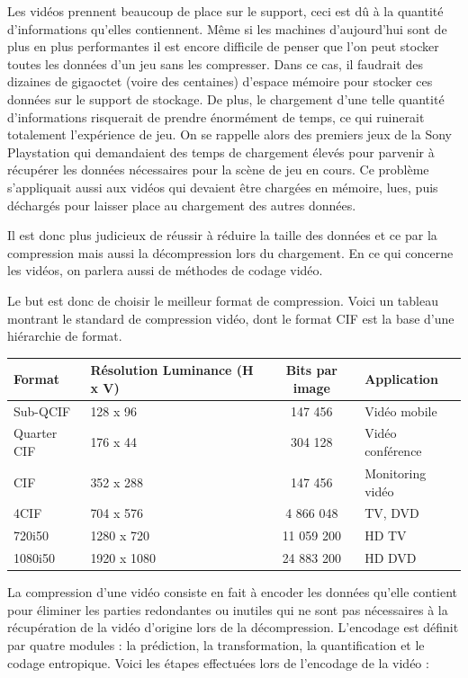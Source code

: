 \documentclass[a4paper, 12pt]{article} %
\begin{document}
Les vidéos prennent beaucoup de place sur le support, ceci est dû à la quantité d'informations qu'elles contiennent. Même si les machines d'aujourd'hui sont de plus en plus performantes il est encore difficile de penser que l'on peut stocker toutes les données d'un jeu sans les compresser. Dans ce cas, il faudrait des dizaines de gigaoctet (voire des centaines) d'espace mémoire pour stocker ces données sur le support de stockage. De plus, le chargement d'une telle quantité d'informations risquerait de prendre énormément de temps, ce qui ruinerait totalement l'expérience de jeu. On se rappelle alors des premiers jeux de la Sony Playstation qui demandaient des temps de chargement élevés pour parvenir à récupérer les données nécessaires pour la scène de jeu en cours. Ce problème s'appliquait aussi aux vidéos qui devaient être chargées en mémoire, lues, puis déchargés pour laisser place au chargement des autres données.

Il est donc plus judicieux de réussir à réduire la taille des données et ce par la compression mais aussi la décompression lors du chargement. En ce qui concerne les vidéos, on parlera aussi de méthodes de codage vidéo.

Le but est donc de choisir le meilleur format de compression. Voici un tableau montrant le standard de compression vidéo, dont le format CIF est la base d'une hiérarchie de format.

\begin{center}
	\begin{tabular}{|l|p{}|c|l|}
		\hline
		Format & Résolution Luminance (H x V) & Bits par image & Application\\
		\hline
		Sub-QCIF&128 x 96&147 456&Vidéo mobile\\
		Quarter CIF&176 x 44&304 128&Vidéo conférence\\
		CIF&352 x 288&147 456&Monitoring vidéo\\
		4CIF&704 x 576&4 866 048&TV, DVD\\
		720i50&1280 x 720&11 059 200&HD TV\\
		1080i50&1920 x 1080&24 883 200&HD DVD\\
		\hline
	\end{tabular}
\end{center}

La compression d'une vidéo consiste en fait à encoder les données qu'elle contient pour éliminer les parties redondantes ou inutiles qui ne sont pas nécessaires à la récupération de la vidéo d'origine lors de la décompression. L'encodage est définit par quatre modules : la prédiction, la transformation, la quantification et le codage entropique. Voici les étapes effectuées lors de l'encodage de la vidéo \cite{compression:video} :
\end{document}
